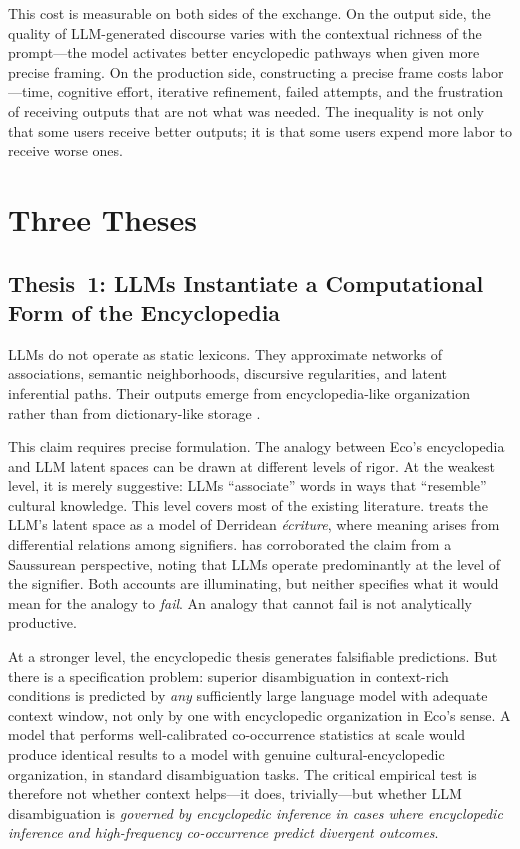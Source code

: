 \documentclass[12pt,a4paper]{article}
\begin{document}
This cost is measurable on both sides of the exchange. On the output side,
the quality of LLM-generated discourse varies with the contextual richness
of the prompt---the model activates better encyclopedic pathways when given
more precise framing. On the production side, constructing a precise frame
costs labor---time, cognitive effort, iterative refinement, failed attempts,
and the frustration of receiving outputs that are not what was needed. The
inequality is not only that some users receive better outputs; it is that
some users expend more labor to receive worse ones.


\section{Three Theses}
\label{sec:theses}

\subsection{Thesis~1: LLMs Instantiate a Computational Form of the Encyclopedia}
\label{sec:thesis1}

LLMs do not operate as static lexicons. They approximate networks of
associations, semantic neighborhoods, discursive regularities, and latent
inferential paths. Their outputs emerge from encyclopedia-like organization
rather than from dictionary-like storage \citep{Eco1984}.

This claim requires precise formulation. The analogy between Eco's encyclopedia
and LLM latent spaces can be drawn at different levels of rigor. At the weakest
level, it is merely suggestive: LLMs ``associate'' words in ways that
``resemble'' cultural knowledge. This level covers most of the existing
literature. \citet{Vromen2024} treats the LLM's latent space as a model of
Derridean \emph{\'ecriture}, where meaning arises from differential relations
among signifiers. \citet{LSM2025} has corroborated the claim from a Saussurean
perspective, noting that LLMs operate predominantly at the level of the
signifier. Both accounts are illuminating, but neither specifies what it would
mean for the analogy to \emph{fail}. An analogy that cannot fail is not
analytically productive.

At a stronger level, the encyclopedic thesis generates falsifiable predictions.
But there is a specification problem: superior disambiguation in context-rich
conditions is predicted by \emph{any} sufficiently large language model with
adequate context window, not only by one with encyclopedic organization in Eco's
sense. A model that performs well-calibrated co-occurrence statistics at scale
would produce identical results to a model with genuine cultural-encyclopedic
organization, in standard disambiguation tasks. The critical empirical test is
therefore not whether context helps---it does, trivially---but whether LLM
disambiguation is \emph{governed by encyclopedic inference in cases where
encyclopedic inference and high-frequency co-occurrence predict divergent
outcomes}.
\end{document}
